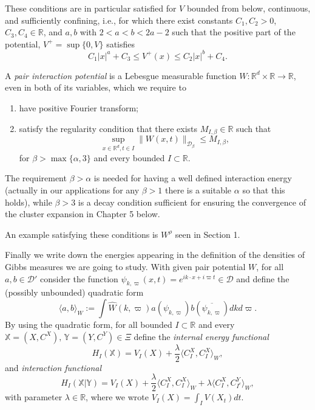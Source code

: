 \documentclass[a4paper,11pt]{article}
\newcommand{\wW}{\widehat W}
\newcommand{\R}{\mathbb{R}}
\newcommand {\D}  {\ensuremath {\mathcal{D}}}
\newcounter {constant}
\begin{document}
These conditions are in particular satisfied for $V$ bounded 
from below, continuous, and sufficiently confining, i.e., for 
which there exist constants $C_1, C_2 > 0$, $C_3, C_4\in \R$, 
and $a,b$ with $2 < a < b < 2a - 2$ such that the positive 
part of the potential, $V^+ = \sup \{0,V\}$ satisfies
\begin{equation} \label{iuccond}
C_1|x|^a + C_3 \leq V^{+}(x) \leq C_2|x|^b + C_4.
\end{equation}


\bigskip

A \emph{pair interaction potential} is a Lebesgue measurable 
function $W: \R^d \times \R \to \R$, even in both of its 
variables, which we require to 
\begin{enumerate}
\item[(1)]
have positive Fourier transform;
\item[(2)]
satisfy the regularity condition that there exists 
$M_{I,\beta} \in \R$ such that
\begin{equation}
\sup_{x\in \R^d ,t\in I} \|W(x,t)\|_{\D_{\beta}} \leq
M_{I,\beta},
\label{a22}
\end{equation}
for $\beta > \max\{\alpha, 3\}$ and every bounded $I \subset 
\R$.
\end{enumerate}
The requirement $\beta>\alpha$ is needed for having a well 
defined interaction energy (actually in our applications for 
any $\beta>1$ there is a suitable $\alpha$ so that this holds), 
while $\beta>3$ is a decay condition sufficient for ensuring 
the convergence of the cluster expansion in Chapter 5 below. 
 
An example satisfying these conditions is $W^\rho$ seen in 
Section 1.

\bigskip
Finally we write down the energies appearing in the definition of 
the densities of Gibbs measures we are going to study. With given 
pair potential $W$, for all $a,b \in \mathcal{D}'$ consider the 
function $\psi_{k,\varpi}(x,t) = e^{ik \cdot x +i\varpi t}\in 
\mathcal{D}$ and define the (possibly unbounded) quadratic form 
$$
\langle a,b \rangle_W := \int \wW(k,\varpi) 
a(\psi_{k,\varpi})b(\overline{\psi_{k,\varpi}}) dk d\varpi. 
$$
By using the quadratic form, 
for all bounded $I \subset \R$ and every $\mathbb{X} = (X, C^X), 
\, \mathbb{Y} = (Y, C^Y) \in \Xi$ define the \emph{internal energy 
functional}
\begin{equation}
H_I(\mathbb{X}) = V_I(X)  + \frac{\lambda }{2}\langle 
C^X_I, C^X_I \rangle_W,
\label{hin}
\end{equation}
and 
\emph{interaction functional}
\begin{equation}
H_I(\mathbb{X}|\mathbb{Y}) =  V_I(X) + 
\frac{\lambda}{2}\langle C^X_I, C^X_I \rangle_W + 
\lambda  \langle C^X_I, C^Y_{I^c} \rangle_W,
\label{hint}
\end{equation}
with parameter $\lambda \in \R$, where we wrote $V_I(X) = 
\int_I V(X_t) dt$.
\end{document}
